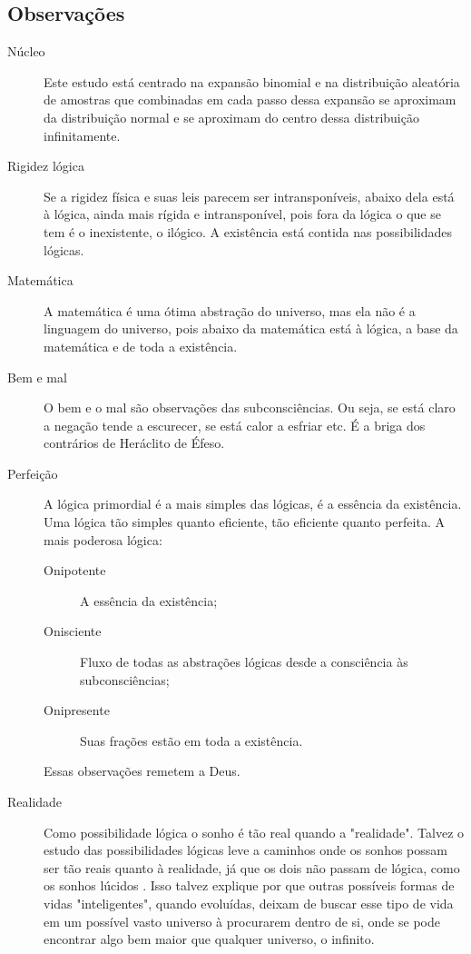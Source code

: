 \subsection{Observações}

\begin{description}
   \item[Núcleo] Este estudo está centrado na expansão binomial e na distribuição aleatória de amostras que combinadas em cada passo dessa expansão se aproximam da distribuição normal e se aproximam do centro dessa distribuição infinitamente.
   \item[Rigidez lógica] Se a rigidez física e suas leis parecem ser intransponíveis, abaixo dela está à lógica, ainda mais rígida e intransponível, pois fora da lógica o que se tem é o inexistente, o ilógico. A existência está contida nas possibilidades lógicas. 
   \item[Matemática] A matemática é uma ótima abstração do universo, mas ela não é a linguagem do universo, pois abaixo da matemática está à lógica, a base da matemática e de toda a existência.
   \item[Bem e mal] O bem e o mal são observações das subconsciências. Ou seja, se está claro a negação tende a escurecer, se está calor a esfriar etc. É a briga dos contrários de Heráclito de Éfeso.
   \item[Perfeição] A lógica primordial é a mais simples das lógicas, é a essência da existência. Uma lógica tão simples quanto eficiente, tão eficiente quanto perfeita. A mais poderosa lógica:
   \begin{description}
	   \item[Onipotente] A essência da existência;
	   \item[Onisciente] Fluxo de todas as abstrações lógicas desde a consciência às subconsciências; 
	   \item[Onipresente] Suas frações estão em toda a existência.
   \end{description}
Essas observações remetem a Deus.
   \item[Realidade] Como possibilidade lógica o sonho é tão real quando a "realidade". Talvez o estudo das possibilidades lógicas leve a caminhos onde os sonhos possam ser tão reais quanto à realidade, já que os dois não passam de lógica, como os sonhos lúcidos \cite{ administradores_principio_pareto}. Isso talvez explique por que outras possíveis formas de vidas "inteligentes", quando evoluídas, deixam de buscar esse tipo de vida em um possível vasto universo à procurarem dentro de si, onde se pode encontrar algo bem maior que qualquer universo, o infinito.
\end{description}